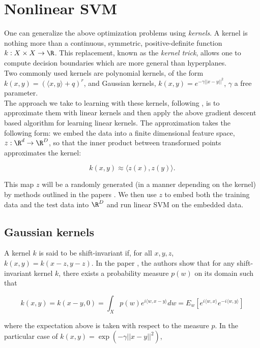 \section{Nonlinear SVM}\label{sec:nonlinear}

One can generalize the above optimization problems using \textit{kernels}. A kernel is nothing more than a continuous, symmetric, positive-definite function $k:X\times X \to \R$. This replacement, known as the \textit{kernel trick}, allows one to compute decision boundaries which are more general than hyperplanes. \\



Two commonly used kernels are polynomial kernels, of the form $k(x,y) = (\langle x,y\rangle +q)^r$, and Gaussian kernels, $k(x,y) = e^{-\gamma||x-y||^2}$, $\gamma$ a free parameter.\\

The approach we take to learning with these kernels, following \cite{RR07}, is to approximate them with linear kernels and then apply the above gradient descent based algorithm for learning linear kernels. The approximation takes the following form: we embed the data into a finite dimensional feature space, $z:\R^d\to \R^D$, so that the inner product between transformed points approximates the kernel:

\[ k(x,y) \approx \langle z(x), z(y)\rangle.\]

This map $z$ will be a randomly generated (in a manner depending on the kernel) by methods outlined in the papers \cite{KK12,RR07}. We then use $z$ to embed both the training data and the test data into $\R^D$ and run linear SVM on the embedded data.\\

\subsection{Gaussian kernels}

A kernel $k$ is said to be shift-invariant if, for all $x,y,z$, $k(x,y) = k(x-z,y-z)$. In the paper \cite{RR07}, the authors show that for any shift-invariant kernel $k$, there exists a probability measure $p(w)$ on its domain such that

\[ k(x,y) = k(x-y,0) = \int_X p(w)e^{i\langle w, x-y\rangle} dw = E_w[e^{i\langle w,x\rangle}e^{-i\langle w,y\rangle}]
\]

where the expectation above is taken with respect to the measure $p$. In the particular case of $k(x,y) = \exp(-\gamma||x-y||^2)$,

